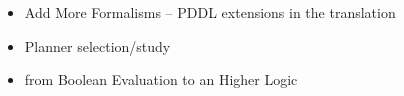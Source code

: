 \documentclass[pdftex,12pt,a4paper]{report}
\begin{document}
\begin{itemize}
\item Add More Formalisms -- PDDL extensions in the translation
\item Planner selection/study
\item from Boolean Evaluation to an Higher Logic
\end{itemize}
%
%
%
%
%
%
%
%
%
\end{document}
